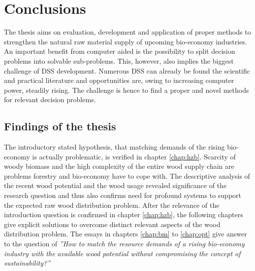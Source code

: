 \chapter{Conclusions}
\label{chap:discussion}
\newpage
\noindent
The thesis aims on evaluation, development and application of proper methods to strengthen the natural raw material supply of upcoming bio-economy industries. An important benefit from computer aided is the possibility to split decision problems into solvable sub-problems. This, however, also implies the biggest challenge of DSS development. Numerous DSS can already be found the scientific and practical literature and opportunities are, owing to increasing computer power, steadily rising. The challenge is hence to find a proper and novel methods for relevant decision problems.

\section{Findings of the thesis}
\label{sec:discussion:findings}
The introductory stated hypothesis, that matching demands of the rising bio-economy is actually problematic, is verified in chapter \ref{chap:hzb}. Scarcity of woody biomass and the high complexity of the entire wood supply chain are problems forestry and bio-economy have to cope with. The descriptive analysis of the recent wood potential and the wood usage revealed significance of the research question and thus also confirms need for profound systems to support the expected raw wood distribution problem. After the relevance of the introduction question is confirmed in chapter \ref{chap:hzb}, the following chapters give explicit solutions to overcome distinct relevant aspects of the wood distribution problem. The essays in chapters \ref{chap:bm} to \ref{chap:opt} give answer to the question of \textit{''How to match the resource demands of a rising bio-economy industry with the available wood potential without compromising the concept of sustainability?''}

